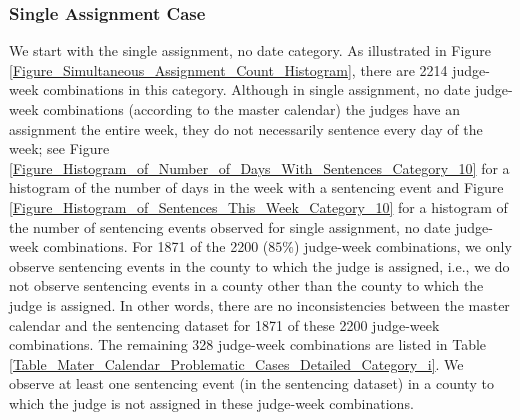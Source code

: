 \documentclass[11pt, oneside]{article}   	%
\theoremstyle{ModifiedStyle}
\begin{document}
		\subsubsection{Single Assignment Case}
			\label{Sec:Master_Calendar:Further_Analysis_of_Some_Assignments:Category_ii}
			We start with the single assignment, no date category. As illustrated in Figure \ref{Figure_Simultaneous_Assignment_Count_Histogram}, there are 2214 judge-week combinations in this category. Although in single assignment, no date judge-week combinations (according to the master calendar) the judges have an assignment the entire week, they do not necessarily sentence every day of the week; see Figure \ref{Figure_Histogram_of_Number_of_Days_With_Sentences_Category_10} for a histogram of the number of days in the week with a sentencing event and Figure \ref{Figure_Histogram_of_Sentences_This_Week_Category_10} for a histogram of the number of sentencing events observed for single assignment, no date judge-week combinations. For 1871 of the 2200 ($85\%$) judge-week combinations, we only observe sentencing events in the county to which the judge is assigned, i.e., we do not observe sentencing events in a county other than the county to which the judge is assigned. In other words, there are no inconsistencies between the master calendar and the sentencing dataset for 1871 of these 2200 judge-week combinations. The remaining 328 judge-week combinations are listed in Table \ref{Table_Mater_Calendar_Problematic_Cases_Detailed_Category_i}. We observe at least one sentencing event (in the sentencing dataset) in a county to which the judge is not assigned in these judge-week combinations. %
\end{document}
